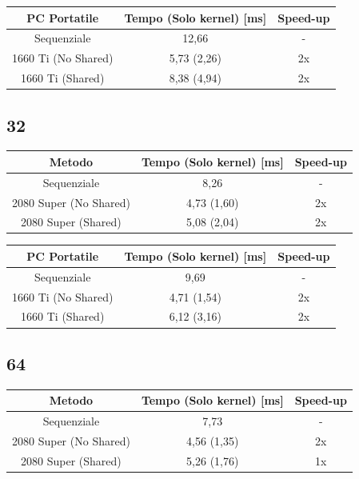 \documentclass[12pt,a4paper]{report}
\begin{document}
			\bigbreak
			
			\begin{tabular}{|c|c|c|}
				\hline
				PC Portatile & Tempo (Solo kernel) [ms] & Speed-up \\
				\hline
				Sequenziale & 12,66 & -  \\
				\hline
				1660 Ti (No Shared) & 5,73 (2,26) & 2x \\
				\hline
				1660 Ti (Shared) & 8,38 (4,94) & 2x \\
				\hline
			\end{tabular}

		\subsection{32}
		
			\begin{tabular}{|c|c|c|}
				\hline
				Metodo & Tempo (Solo kernel) [ms] & Speed-up \\
				\hline
				Sequenziale & 8,26 & -  \\
				\hline
				2080 Super (No Shared) & 4,73 (1,60) & 2x \\
				\hline
				2080 Super (Shared) & 5,08 (2,04) & 2x \\
				\hline
			\end{tabular}
			
			\bigbreak
			
			\begin{tabular}{|c|c|c|}
				\hline
				PC Portatile & Tempo (Solo kernel) [ms] & Speed-up \\
				\hline
				Sequenziale & 9,69 & -  \\
				\hline
				1660 Ti (No Shared) & 4,71 (1,54) & 2x \\
				\hline
				1660 Ti (Shared) & 6,12 (3,16) & 2x \\
				\hline
			\end{tabular}

		\subsection{64}
		
			\begin{tabular}{|c|c|c|}
				\hline
				Metodo & Tempo (Solo kernel) [ms] & Speed-up \\
				\hline
				Sequenziale & 7,73 & -  \\
				\hline
				2080 Super (No Shared) & 4,56 (1,35) & 2x \\
				\hline
				2080 Super (Shared) & 5,26 (1,76) & 1x \\
				\hline
			\end{tabular}
			
\end{document}

